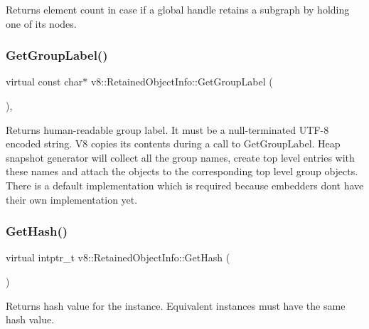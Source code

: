 Returns element count in case if a global handle retains a subgraph by holding one of its nodes. \mbox{\label{classv8_1_1RetainedObjectInfo_adf835370c5516f2a89dd2d3f83dee10b}} 
\subsubsection{\texorpdfstring{Get\+Group\+Label()}{GetGroupLabel()}}
{\footnotesize\ttfamily virtual const char$\ast$ v8\+::\+Retained\+Object\+Info\+::\+Get\+Group\+Label (\begin{DoxyParamCaption}{ }\end{DoxyParamCaption})\hspace{0.3cm}{\ttfamily [inline]}, {\ttfamily [virtual]}}

Returns human-\/readable group label. It must be a null-\/terminated U\+T\+F-\/8 encoded string. V8 copies its contents during a call to Get\+Group\+Label. Heap snapshot generator will collect all the group names, create top level entries with these names and attach the objects to the corresponding top level group objects. There is a default implementation which is required because embedders don\textquotesingle{}t have their own implementation yet. \mbox{\label{classv8_1_1RetainedObjectInfo_a6fdbfa242b95615e63f08433419c8066}} 
\subsubsection{\texorpdfstring{Get\+Hash()}{GetHash()}}
{\footnotesize\ttfamily virtual intptr\+\_\+t v8\+::\+Retained\+Object\+Info\+::\+Get\+Hash (\begin{DoxyParamCaption}{ }\end{DoxyParamCaption})\hspace{0.3cm}{\ttfamily [pure virtual]}}

Returns hash value for the instance. Equivalent instances must have the same hash value. \mbox{\label{classv8_1_1RetainedObjectInfo_ad19106fc7f0499fd45005077551d54c0}} 
